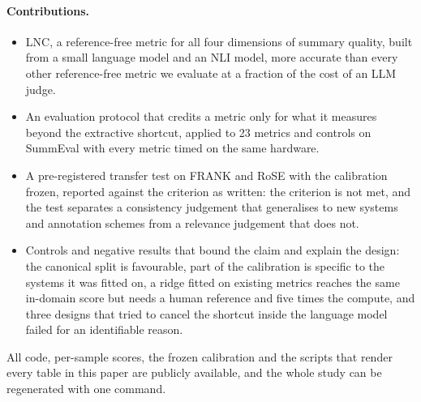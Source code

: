 \paragraph{Contributions.}
\begin{itemize}
  \item LNC, a reference-free metric for all four dimensions of summary quality, built from a small language model and an NLI model, more accurate than every other reference-free metric we evaluate at a fraction of the cost of an LLM judge.
  \item An evaluation protocol that credits a metric only for what it measures beyond the extractive shortcut, applied to 23 metrics and controls on SummEval with every metric timed on the same hardware.
  \item A pre-registered transfer test on FRANK and RoSE with the calibration frozen, reported against the criterion as written: the criterion is not met, and the test separates a consistency judgement that generalises to new systems and annotation schemes from a relevance judgement that does not.
  \item Controls and negative results that bound the claim and explain the design: the canonical split is favourable, part of the calibration is specific to the systems it was fitted on, a ridge fitted on existing metrics reaches the same in-domain score but needs a human reference and five times the compute, and three designs that tried to cancel the shortcut inside the language model failed for an identifiable reason.
\end{itemize}

All code, per-sample scores, the frozen calibration and the scripts that render every table in this paper are publicly available, and the whole study can be regenerated with one command.
